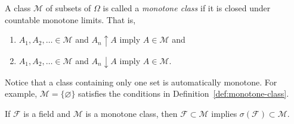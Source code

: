 \documentclass[11pt,fleqn]{book} %
\begin{document}
\begin{definition}  \label{def:monotone-class}
	A class $\mathcal{M}$ of subsets of $\Omega$ is called a \emph{monotone class} if it is closed under countable monotone limits. That is,
	\begin{enumerate}[label=(\roman*)]
		\item $A_1,A_2,\dots \in \mathcal{M}$ and $A_n \uparrow A$ imply $A \in \mathcal{M}$ and
		\item $A_1,A_2,\dots \in \mathcal{M}$ and $A_n \downarrow A$ imply $A \in \mathcal{M}$.
	\end{enumerate}
\end{definition}

Notice that a class containing only one set is automatically monotone. For example, $\mathcal{M} = \{\varnothing\}$ satisfies the conditions in Definition~\ref{def:monotone-class}.

\begin{theorem} \label{thm:monotone-class}
	If $\mathcal{F}$ is a field and $\mathcal{M}$ is a monotone class, then $\mathcal{F} \subset \mathcal{M}$ implies $\sigma(\mathcal{F}) \subset \mathcal{M}$.
\end{theorem}
\end{document}
